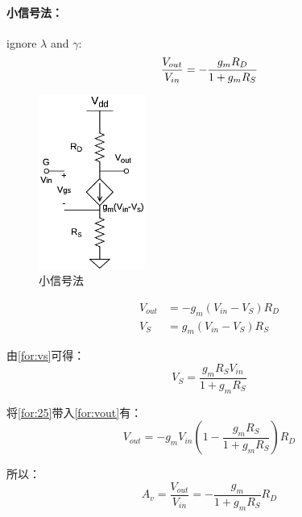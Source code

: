\documentclass[twoside,a4paper,openright,titlepage,draft]{ctexrep}
\begin{document}
\paragraph{小信号法：}
ignore $\lambda$ and $\gamma$: 
\begin{equation}
    \frac{V_{out}}{V_{in}}=-\frac{g_mR_D}{1+g_mR_S} \notag
\end{equation}
\newpage
\begin{multicols}{2}
    \begin{figure}[H]
        \centering
        \includegraphics[width=35mm]{sourcedegenerationsmallsignal.eps}
        \caption{小信号法}
        \label{fig:小信号法}
    \end{figure}
    \columnbreak
    \begin{align}
        V_{out} &= -g_m(V_{in} - V_S)R_D \label{for:vout} \\
        V_S &= g_m(V_{in} - V_S)R_S \label{for:vs}
    \end{align}
\end{multicols}

由\ref{for:vs}可得：
\begin{equation}
    V_S = \frac{g_mR_SV_{in}}{1 + g_mR_S} \label{for:25}
\end{equation}

将\ref{for:25}带入\ref{for:vout}有：
\begin{equation}
    V_{out} = -g_mV_{in}(1 - \frac{g_mR_S}{1 + g_mR_S})R_D
\end{equation}

所以：
\begin{equation}
    A_v = \frac{V_{out}}{V_{in}} = -\frac{g_m}{1 + g_mR_S}R_D
\end{equation}
\end{document}
